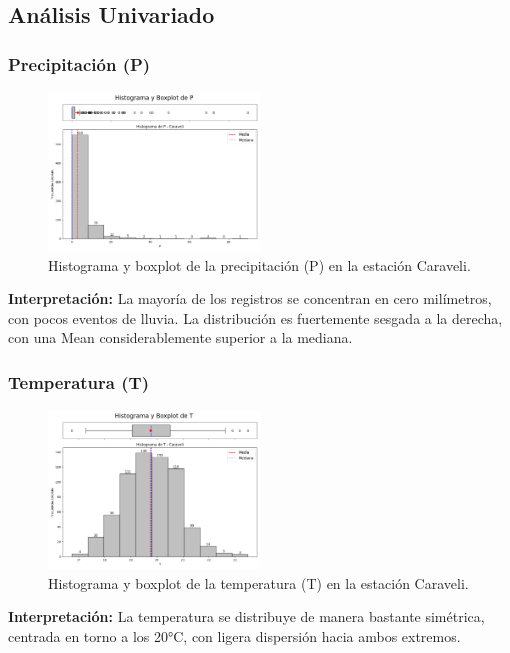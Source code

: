 \subsection{Análisis Univariado}

\subsubsection*{Precipitación (P)}
\begin{figure}[H]
\centering
\includegraphics[width=0.5\textwidth]{resultados/por_estacion_meteorologica/Caraveli/P_histograma.png}
\caption{Histograma y boxplot de la precipitación (P) en la estación Caraveli.}
\label{fig:caraveli_P}
\end{figure}
\textbf{Interpretación:} La mayoría de los registros se concentran en cero milímetros, con pocos eventos de lluvia. La distribución es fuertemente sesgada a la derecha, con una Mean considerablemente superior a la mediana.

\subsubsection*{Temperatura (T)}
\begin{figure}[H]
\centering
\includegraphics[width=0.5\textwidth]{resultados/por_estacion_meteorologica/Caraveli/T_histograma.png}
\caption{Histograma y boxplot de la temperatura (T) en la estación Caraveli.}
\label{fig:caraveli_T}
\end{figure}
\textbf{Interpretación:} La temperatura se distribuye de manera bastante simétrica, centrada en torno a los 20°C, con ligera dispersión hacia ambos extremos.

